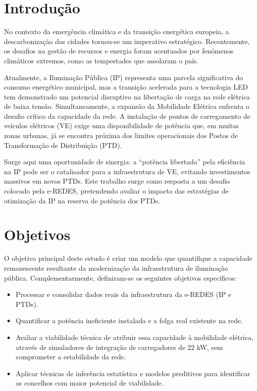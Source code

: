 \documentclass[conference]{IEEEtran}
\begin{document}
\section{Introdução}

No contexto da emergência climática e da transição energética europeia, a descarbonização das cidades tornou-se um imperativo estratégico. Recentemente, os desafios na gestão de recursos e energia foram acentuados por fenómenos climáticos extremos, como as tempestades que assolaram o país. 

Atualmente, a Iluminação Pública (IP) representa uma parcela significativa do consumo energético municipal, mas a transição acelerada para a tecnologia LED tem demonstrado um potencial disruptivo na libertação de carga na rede elétrica de baixa tensão. Simultaneamente, a expansão da Mobilidade Elétrica enfrenta o desafio crítico da capacidade da rede. A instalação de pontos de carregamento de veículos elétricos (VE) exige uma disponibilidade de potência que, em muitas zonas urbanas, já se encontra próxima dos limites operacionais dos Postos de Transformação de Distribuição (PTD). 

Surge aqui uma oportunidade de sinergia: a ``potência libertada'' pela eficiência na IP pode ser o catalisador para a infraestrutura de VE, evitando investimentos massivos em novos PTDs. Este trabalho surge como resposta a um desafio colocado pela e-REDES, pretendendo avaliar o impacto das estratégias de otimização da IP na reserva de potência dos PTDs.

\section{Objetivos}

O objetivo principal deste estudo é criar um modelo que quantifique a capacidade remanescente resultante da modernização da infraestrutura de iluminação pública. Complementarmente, definiram-se os seguintes objetivos específicos:

\begin{itemize}
\item Processar e consolidar dados reais da infraestrutura da e-REDES (IP e PTDs).

\item Quantificar a potência ineficiente instalada e a folga real existente na rede.

\item Avaliar a viabilidade técnica de atribuir essa capacidade à mobilidade elétrica, através de simuladores de integração de carregadores de 22 kW, sem comprometer a estabilidade da rede.

\item Aplicar técnicas de inferência estatística e modelos preditivos para identificar os concelhos com maior potencial de viabilidade.
\end{itemize}
\end{document}
